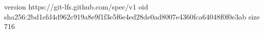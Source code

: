 version https://git-lfs.github.com/spec/v1
oid sha256:2bd1efd4d962c919a8e9f1f3e5f6e4ed28de0ad8007e4360fca64048f0f0e3ab
size 716
